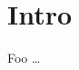 \documentclass[12pt,oneside,onecolumn,a4paper,final]{article}
\begin{document}
	

	\section{Intro}

	Foo \ldots
\end{document}
